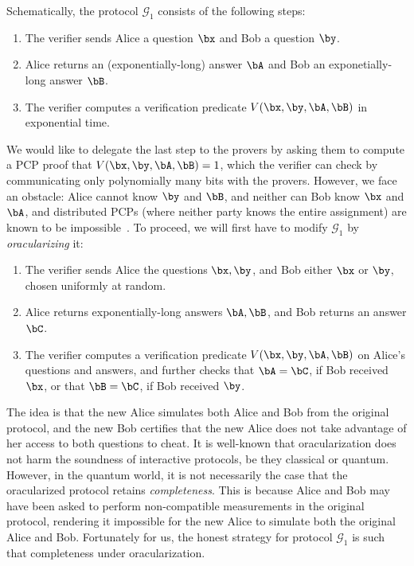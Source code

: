 \documentclass[11pt]{article}
\newcommand{\game}{\mathscr{G}}
\begin{document}
Schematically, the protocol $\game_{1}$ consists of the following
steps:
\begin{enumerate}
  \item The verifier sends Alice a question $\bx$ and Bob a question
    $\by$.
  \item Alice returns an (exponentially-long) answer $\bA$ and Bob an
    exponetially-long answer $\bB$.
  \item The verifier computes a verification predicate $V(\bx, \by,
    \bA, \bB)$ in exponential time.
  \end{enumerate}
  We would like to delegate the last step to the provers by asking
  them to compute a PCP proof that $V(\bx, \by,\bA,\bB) = 1$, which
  the verifier can check by communicating only polynomially many bits
  with the provers. However, we face
  an obstacle: Alice cannot know $\by$ and $\bB$, and neither can Bob
  know $\bx$ and $\bA$, and distributed PCPs (where neither party
  knows the entire assignment) are known to be
  impossible~\cite{ARW17}. To proceed, we will first have to modify
  $\game_{1}$ by \emph{oracularizing} it:
  \begin{enumerate}
    \item The verifier sends Alice the questions $\bx, \by$, and Bob
      either $\bx$ or $\by$, chosen uniformly at random.
    \item Alice returns exponentially-long answers $\bA, \bB$, and
      Bob returns an answer $\bC$.
    \item The verifier computes a verification predicate $V(\bx,
      \by, \bA, \bB)$ on Alice's questions and answers, and further
      checks that $\bA = \bC$, if Bob received $\bx$, or that $\bB =
      \bC$, if Bob received $\by$.
    \end{enumerate}
    The idea is that the new Alice simulates both Alice and Bob from
    the original protocol, and the new Bob certifies that the new
    Alice does not take advantage of her access to both questions to cheat.
    It is well-known that oracularization does not harm the soundness
    of interactive protocols, be they classical or quantum. However,
    in the quantum world, it is not necessarily the case that the
    oracularized protocol retains \emph{completeness}. This is because
    Alice and Bob may have been asked to perform non-compatible
    measurements in the original protocol, rendering it impossible for
    the new Alice to simulate both the original Alice and
    Bob. Fortunately for us, the honest strategy for protocol
    $\game_1$ is such that completeness under oracularization.
    
\end{document}
